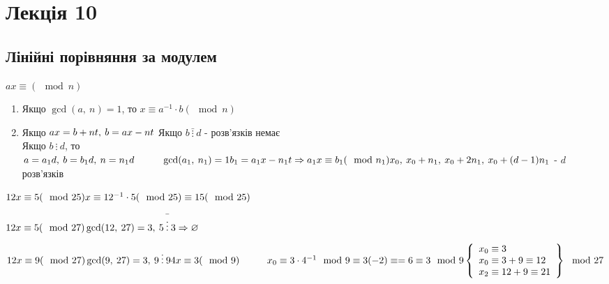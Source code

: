 \documentclass[a4paper,12pt]{bookest}
\newcommand\tab[1][1cm]{\hspace*{#1}}
\begin{document}
\chapter{Лекція 10}
\section{Лінійні порівняння за модулем}
$ax\equiv(\mod n)$
\begin{enumerate}
	\item Якщо $\gcd(a,\>n)=1$, то $x\equiv a^{-1}\cdot b(\mod n)$
	\item Якщо $ax=b+nt,\>b=ax-nt\\$ Якщо $b\>\bar{\vdots}\>d$ - розв'язків немає\\ Якщо $b\>\vdots\>d$, то  $a=a_1d,\>b=b_1d,\>n=n_1d\tab \gcd(a_1,\>n_1)=1\\b_1=a_1x-n_1t\Rightarrow a_1x\equiv b_1(\mod n_1)\\x_0,\>x_0+n_1,\>x_0+2n_1,\>x_0+(d-1)n_1$ - $d$ розв'язків
\end{enumerate}
\begin{example}
	$12x\equiv 5(\mod 25)\\x\equiv 12^{-1}\cdot 5(\mod 25)\equiv 15(\mod 25)$
\end{example}
\begin{example}
	$12x\equiv5(\mod 27)\\\gcd(12,\>27)=3,\>5\>\bar{\vdots}\>3\Rightarrow \varnothing$
\end{example}
\begin{example}
	$12x\equiv 9(\mod 27)\\\gcd(9,\>27)=3,\>9\>\vdots\>9\\4x\equiv3(\mod 9)\tab x_0\equiv3\cdot4^{-1}\mod 9\equiv3(-2)\equiv=6\equiv 3\mod 9\\\left\{\begin{array}{l}
		x_0\equiv 3\\x_0\equiv3+9\equiv 12\\x_2\equiv12+9\equiv 21
	\end{array}\right\}\mod 27$
\end{example}
\end{document}
